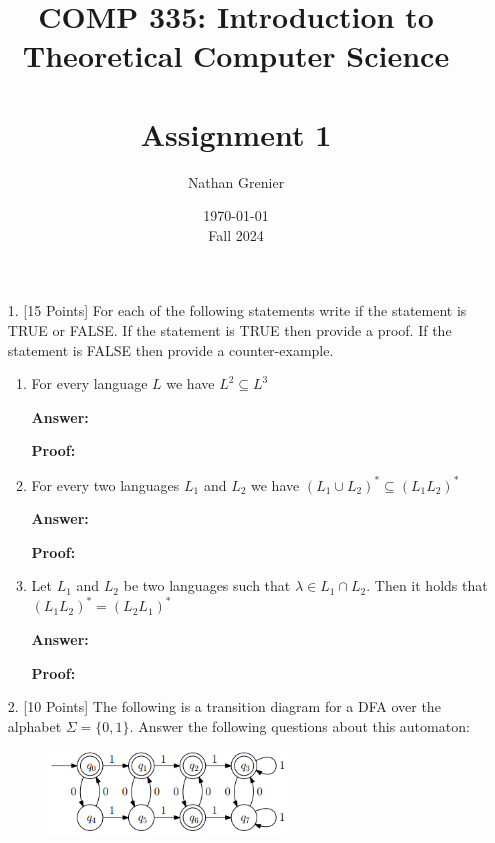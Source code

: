 \documentclass[12pt]{article}
\title{COMP 335: Introduction to Theoretical Computer Science\\
\ \\
Assignment 1}
\author{Nathan Grenier}
\date{\today \\ Fall 2024}
\begin{document}
\maketitle

\newpage

\begin{enumerate}

\item[1.] [15 Points] For each of the following statements write if the statement is TRUE or FALSE. If the statement is TRUE then provide a proof. If the statement is FALSE then provide a counter-example.

\begin{enumerate}
	
	\item For every language $L$ we have $L^2 \subseteq L^3$
	
	\noindent \textbf{Answer:}

	\noindent \textbf{Proof:} 
	
	\item For every two languages $L_1$ and $L_2$ we have $(L_1 \cup L_2)^* \subseteq (L_1L_2)^*$
	
	\noindent \textbf{Answer:}

	\noindent \textbf{Proof:} 

	\item Let $L_1$ and $L_2$ be two languages such that $\lambda \in L_1 \cap L_2$. Then it holds that $(L_1L_2)^* = (L_2L_1)^*$
	
	\noindent \textbf{Answer:}

	\noindent \textbf{Proof:} 
	
\end{enumerate}

\newpage

\item[2.] [10 Points] The following is a transition diagram for a DFA over the alphabet $\Sigma = \{0,1\}$. Answer the following questions about this automaton:

\begin{figure}[h!]
	\centering
	\includegraphics[width=0.6\textwidth]{img/q2_automata.png}
\end{figure}


\end{enumerate}
\end{document}
